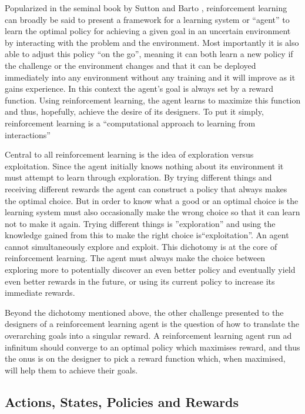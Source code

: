 Popularized in the seminal book by Sutton and Barto \cite{sutton_barto}, reinforcement learning can broadly be said to present a framework for a learning system or “agent” to learn the optimal policy for achieving a given goal in an uncertain environment by interacting with the problem and the environment. Most importantly it is also able to adjust this policy ``on the go'', meaning it can both learn a new policy if the challenge or the environment changes and that it can be deployed immediately into any environment without any training and it will improve as it gains experience. In this context the agent's goal is always set by a reward function. Using reinforcement learning, the agent learns to maximize this function and thus, hopefully, achieve the desire of its designers. To put it simply, reinforcement learning is a “computational approach to learning from interactions” \cite{sutton_barto}

Central to all reinforcement learning is the idea of exploration versus exploitation. Since the agent initially knows nothing about its environment it must attempt  to learn through exploration. By trying different things and receiving different rewards the agent can construct a policy that always makes the optimal choice. But in order to know what a good or an optimal choice is the learning system must also occasionally make the wrong choice so that it can learn not to make it again. Trying different things is ''exploration'' and using the knowledge gained from this to make the right choice is``exploitation''. An agent cannot simultaneously explore and exploit. This dichotomy is at the core of reinforcement learning. The agent must always make the choice between exploring more to potentially discover an even better policy and eventually yield even better rewards in the future, or using its current policy to increase its immediate rewards.

Beyond the dichotomy mentioned above, the other challenge presented to the designers of a reinforcement learning agent is the question of how to translate the overarching goals into a singular reward. A reinforcement learning agent run ad infinitum should converge to an optimal policy which maximises reward, and thus the onus is on the designer to pick a reward function which, when maximised, will help them to achieve their goals. 

\subsection{Actions, States, Policies and Rewards}
\label{subsec:agent}

